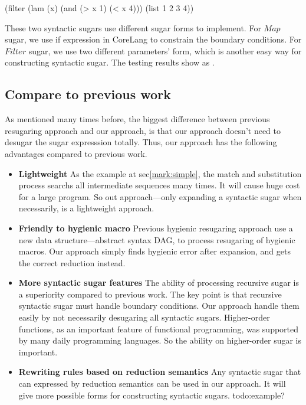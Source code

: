 \begin{Codes}
    (filter (lam (x) (and (> x 1) (< x 4))) (list 1 2 3 4))
\end{Codes}

These two syntactic sugars use different sugar forms to implement. For $Map$ sugar, we use if expression in CoreLang to constrain the boundary conditions. For $Filter$ sugar, we use two different parameters' form, which is another easy way for constructing syntactic sugar. The testing results show as .


\subsection{Compare to previous work}

As mentioned many times before, the biggest difference between previous resugaring approach and our approach, is that our approach doesn't need to desugar the sugar expresssion totally. Thus, our approach has the following advantages compared to previous work.

\begin{itemize}
	\item {\bfseries Lightweight} As the example at sec\ref{mark:simple}, the match and substitution process searchs all intermediate sequences many times. It will cause huge cost for a large program. So out approach---only expanding a syntactic sugar when necessarily, is a lightweight approach.
	\item {\bfseries Friendly to hygienic macro} Previous hygienic resugaring approach use a new data structure---abstract syntax DAG, to process resugaring of hygienic macros. Our approach simply finds hygienic error after expansion, and gets the correct reduction instead.
	\item {\bfseries More syntactic sugar features} The ability of processing recursive sugar is a superiority compared to previous work. The key point is that recursive syntactic sugar must handle boundary conditions. Our approach handle them easily by not necessarily desugaring all syntactic sugars. Higher-order functions, as an important feature of functional programming, was supported by many daily programming languages. So the ability on higher-order sugar is important.
	\item {\bfseries Rewriting rules based on reduction semantics} Any syntactic sugar that can expressed by reduction semantics can be used in our approach. It will give more possible forms for constructing syntactic sugars. todo:example?
\end{itemize}

